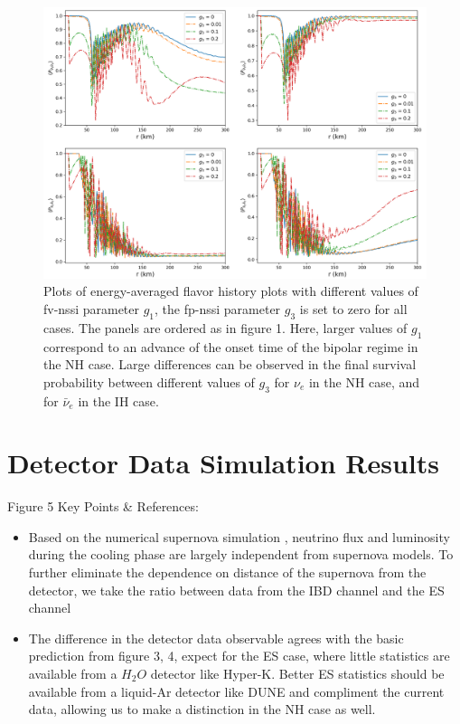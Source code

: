 \documentclass[11pt, oneside]{article}   	%
\begin{document}
\begin{figure}[t]
\begin{center}
\includegraphics[width=\linewidth]{flavor_evo_fv.png}
\caption{Plots of energy-averaged flavor history plots with different values of fv-nssi parameter $g_1$, the fp-nssi parameter $g_3$ is set to zero for all cases. The panels are ordered as in figure 1. Here, larger values of $g_1$ correspond to an advance of the onset time of the bipolar regime in the NH case. Large differences can be observed in the final survival probability between different values of $g_3$ for $\nu_e$ in the NH case, and for $\bar \nu_e$ in the IH case.}
\label{fig:fe_fv}
\end{center}
\end{figure}

\section{Detector Data Simulation Results}

Figure 5 Key Points \& References:
\begin{itemize}
  \item Based on the numerical supernova simulation \cite{Nakasato}, neutrino flux and luminosity during the cooling phase are largely independent from supernova models. To further eliminate the dependence on distance of the supernova from the detector, we take the ratio between data from the IBD channel and the ES channel
  \item The difference in the detector data observable agrees with the basic prediction from figure 3, 4, expect for the ES case, where little statistics are available from a $H_2O$ detector like Hyper-K. Better ES statistics should be available from a liquid-Ar detector like DUNE and compliment the current data, allowing us to make a distinction in the NH case as well.
\end{itemize}
\end{document}
